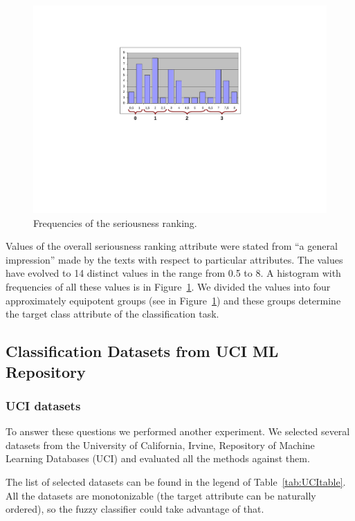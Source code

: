 \begin{figure}
\centerline{\includegraphics[angle=-90, width=0.6\hsize]{ranking_histogram}}
\caption{Frequencies of the seriousness ranking.}
\label{img:ch40_ranking_histogram}
\end{figure}

Values of the overall seriousness ranking attribute were stated from ``a general impression'' made by the texts with respect to particular attributes. %
The values have evolved to 14 distinct values in the range from 0.5 to 8. 
A histogram with frequencies of all these values is in Figure~\ref{img:ch40_ranking_histogram}.
We divided the values into four approximately equipotent groups 
(see in Figure~\ref{img:ch40_ranking_histogram}) 
and these groups determine the target class attribute of the classification task. 






\subsection{Classification Datasets from UCI ML Repository} \label{sec:ch40_uci_datasets}
\subsubsection{UCI datasets}

To answer these questions we performed another experiment. We selected several datasets from the University of California, Irvine, Repository of Machine Learning Databases (UCI) \citep{biblio:UCI} and evaluated all the methods against them. 



The list of selected datasets can be found in the legend of Table~\ref{tab:UCItable}. All the datasets are monotonizable (the target attribute can be naturally ordered), so the fuzzy classifier could take advantage of that.


